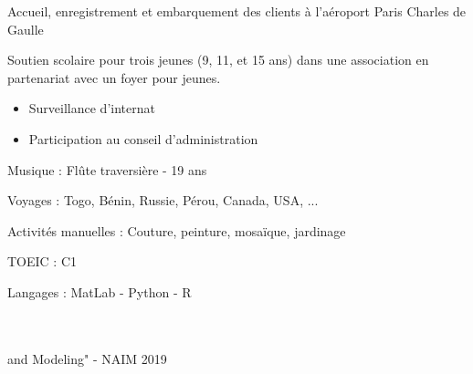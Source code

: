 




   Accueil, enregistrement et embarquement des clients à l'aéroport Paris Charles de Gaulle

\divider

Soutien scolaire pour trois jeunes (9, 11, et 15 ans) dans une association en
partenariat avec un foyer pour jeunes.

\divider

\begin{itemize}
\item Surveillance d'internat
\item Participation au conseil d'administration
\end{itemize}



{\large\color{emphasis} \faMusic \vspace{0.2cm}  Musique : } 
    Flûte traversière - 19 ans\\
  \vspace{0.5cm}

{\large\color{emphasis} \faGlobe \vspace{0.2cm} Voyages : }  
    Togo, Bénin, Russie, Pérou, Canada, USA, ...\\
  \vspace{0.5cm}
  
{\large\color{emphasis} \faCut  \vspace{0.2cm} Activités manuelles : }
    Couture, peinture, mosaïque, jardinage


TOEIC : C1



Langages : MatLab - Python  - R\\
\vspace{0.5cm}

\vspace{0.5cm}

 \\
 \\ \hspace{0.5cm} and Modeling" - NAIM 2019
    
